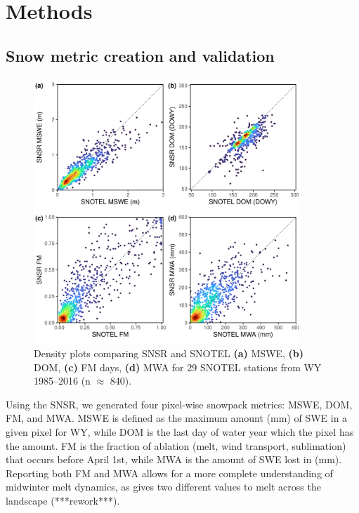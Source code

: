 \hypertarget{ch2-methods}{\section{Methods}\label{ch2-methods}}
\hypertarget{ch2-methods-1}{\subsection{Snow metric creation and validation}\label{ch2-methods-1}}

\begin{figure}[t]
\centering
\includegraphics[width=10cm]{figures/ch2_figs/snsr_snotel_metric_compare_new_v1.pdf}
\caption{Density plots comparing SNSR and SNOTEL \textbf{(a)} MSWE, \textbf{(b)} DOM, \textbf{(c)} FM days, \textbf{(d)} MWA for 29 SNOTEL stations from WY 1985--2016 (n $\approx$ 840).}
\label{kuy_study_area}
\end{figure}

Using the SNSR, we generated four pixel-wise snowpack metrics: MSWE, DOM, FM, and MWA. MSWE is defined as the maximum amount (mm) of SWE in a given pixel for WY, while DOM is the last day of water year which the pixel has the amount. FM is the fraction of ablation (melt, wind transport, sublimation) that occurs before April 1st, while MWA is the amount of SWE lost in (mm). Reporting both FM and MWA allows for a more complete understanding of midwinter melt dynamics, as gives two different values to melt across the landscape (***rework***).

